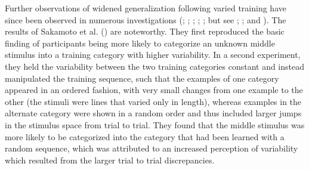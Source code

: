 \documentclass[
  11pt,
  letterpaper,
]{article}
\begin{document}
Further observations of widened generalization following varied training
have since been observed in numerous investigations
(;
;
; ; ; but see
; ; and ). The results of Sakamoto et al.
() are noteworthy.
They first reproduced the basic finding of participants being more
likely to categorize an unknown middle stimulus into a training category
with higher variability. In a second experiment, they held the
variability between the two training categories constant and instead
manipulated the training sequence, such that the examples of one
category appeared in an ordered fashion, with very small changes from
one example to the other (the stimuli were lines that varied only in
length), whereas examples in the alternate category were shown in a
random order and thus included larger jumps in the stimulus space from
trial to trial. They found that the middle stimulus was more likely to
be categorized into the category that had been learned with a random
sequence, which was attributed to an increased perception of variability
which resulted from the larger trial to trial discrepancies.
\end{document}
